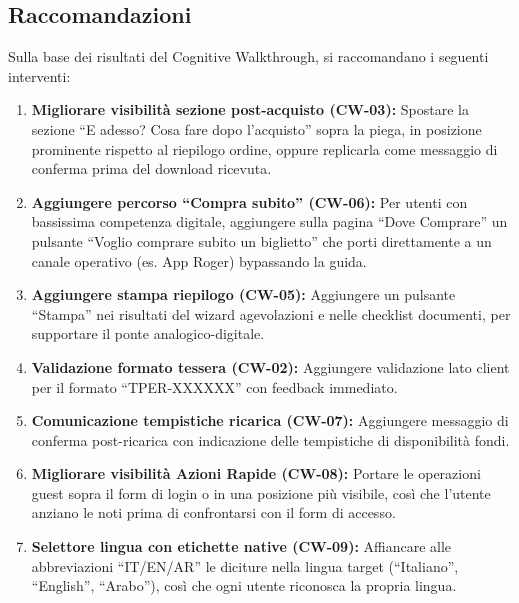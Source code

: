 \vspace{0.3cm}

\subsection{Raccomandazioni}

\begin{tcolorbox}[colback=backgroundColor,colframe=accentGreen,arc=2mm]
\small
Sulla base dei risultati del Cognitive Walkthrough, si raccomandano i seguenti interventi:

\begin{enumerate}[leftmargin=*]
 \item \textbf{Migliorare visibilità  sezione post-acquisto (CW-03):} Spostare la sezione ``E adesso? Cosa fare dopo l'acquisto'' sopra la piega, in posizione prominente rispetto al riepilogo ordine, oppure replicarla come messaggio di conferma prima del download ricevuta.

 \item \textbf{Aggiungere percorso ``Compra subito'' (CW-06):} Per utenti con bassissima competenza digitale, aggiungere sulla pagina ``Dove Comprare'' un pulsante ``Voglio comprare subito un biglietto'' che porti direttamente a un canale operativo (es. App Roger) bypassando la guida.

 \item \textbf{Aggiungere stampa riepilogo (CW-05):} Aggiungere un pulsante ``Stampa'' nei risultati del wizard agevolazioni e nelle checklist documenti, per supportare il ponte analogico-digitale.

 \item \textbf{Validazione formato tessera (CW-02):} Aggiungere validazione lato client per il formato ``TPER-XXXXXX'' con feedback immediato.

 \item \textbf{Comunicazione tempistiche ricarica (CW-07):} Aggiungere messaggio di conferma post-ricarica con indicazione delle tempistiche di disponibilità  fondi.

 \item \textbf{Migliorare visibilità  Azioni Rapide (CW-08):} Portare le operazioni guest sopra il form di login o in una posizione più visibile, così che l'utente anziano le noti prima di confrontarsi con il form di accesso.

 \item \textbf{Selettore lingua con etichette native (CW-09):} Affiancare alle abbreviazioni ``IT/EN/AR'' le diciture nella lingua target (``Italiano'', ``English'', ``Arabo''), così che ogni utente riconosca la propria lingua.


\end{enumerate}
\end{tcolorbox}
